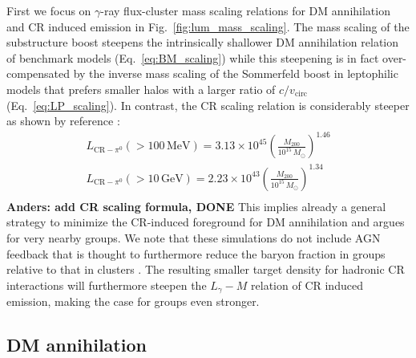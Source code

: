 \documentclass[10pt,aps,pra,reprint,amsmath,amsfonts,amssymb,showpacs,nofootinbib,floatfix]{revtex4-1}
\newcommand{\rmn}{\mathrm}
\newcommand{\msun}{M_\odot}
\newcommand{\mev}{\rmn{MeV}}
\newcommand{\gev}{\rmn{GeV}}
\newcommand{\mvir}{M_{200}}
\begin{document}
First we focus on $\gamma$-ray flux-cluster mass scaling relations for DM
annihilation and CR induced emission in Fig.~\ref{fig:lum_mass_scaling}.  The
mass scaling of the substructure boost steepens the intrinsically shallower DM
annihilation relation of benchmark models (Eq.~\ref{eq:BM_scaling}) while
this steepening is in fact over-compensated by the inverse mass scaling of the
Sommerfeld boost in leptophilic models that prefers smaller halos with a larger
ratio of $c/v_\mathrm{circ}$ (Eq.~\ref{eq:LP_scaling}). In contrast, the
CR scaling relation is considerably steeper as shown by reference
\cite{2010MNRAS.409..449P}: 
\begin{eqnarray}
L_{\rmn{CR}-\ensuremath{\pi^0}}(>100\,\mev) = 3.13\times10^{45}
\left(\frac{\mvir}{10^{15}\,\msun}\right)^{1.46}\nonumber\\
L_{\rmn{CR}-\ensuremath{\pi^0}}(>10\,\gev)  = 2.23\times10^{43}
\left(\frac{\mvir}{10^{15}\,\msun}\right)^{1.34}\nonumber\\
\end{eqnarray}
{\bf Anders: add CR scaling formula, DONE} This implies
already a general strategy to minimize the CR-induced foreground for DM
annihilation and argues for very nearby groups. We note that these simulations
do not include AGN feedback that is thought to furthermore reduce the baryon
fraction in groups relative to that in clusters \cite{2008ApJ...687L..53P}. The
resulting smaller target density for hadronic CR interactions will furthermore
steepen the $L_\gamma-M$ relation of CR induced emission, making the case for
groups even stronger.

\subsection{DM annihilation}
\end{document}
